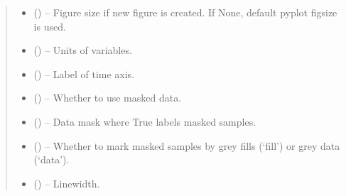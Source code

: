 \documentclass[letterpaper,10pt,english]{sphinxmanual}
\begin{document}
\begin{fulllineitems}
\begin{quote}
\begin{description}
\begin{itemize}
\item {} 
 (\sphinxstyleliteralemphasis{, }\sphinxstyleliteralemphasis{ (}\sphinxstyleliteralemphasis{)}\sphinxstyleliteralemphasis{}) -- Figure size if new figure is created. If None, default pyplot figsize
is used.

\item {} 
 (\sphinxstyleliteralemphasis{, }\sphinxstyleliteralemphasis{ (}\sphinxstyleliteralemphasis{)}\sphinxstyleliteralemphasis{}) -- Units of variables.

\item {} 
 (\sphinxstyleliteralemphasis{, }\sphinxstyleliteralemphasis{ (}\sphinxstyleliteralemphasis{)}\sphinxstyleliteralemphasis{}) -- Label of time axis.

\item {} 
 (\sphinxstyleliteralemphasis{, }\sphinxstyleliteralemphasis{ (}\sphinxstyleliteralemphasis{)}\sphinxstyleliteralemphasis{}) -- Whether to use masked data.

\item {} 
 (\sphinxstyleliteralemphasis{, }\sphinxstyleliteralemphasis{ (}\sphinxstyleliteralemphasis{)}\sphinxstyleliteralemphasis{}) -- Data mask where True labels masked samples.

\item {} 
 (\sphinxstyleliteralemphasis{, }\sphinxstyleliteralemphasis{ (}\sphinxstyleliteralemphasis{)}\sphinxstyleliteralemphasis{}) -- Whether to mark masked samples by grey fills (`fill') or grey data (`data').

\item {} 
 (\sphinxstyleliteralemphasis{, }\sphinxstyleliteralemphasis{ (}\sphinxstyleliteralemphasis{)}\sphinxstyleliteralemphasis{}) -- Linewidth.


\end{itemize}
\end{description}
\end{quote}
\end{fulllineitems}
\end{document}
